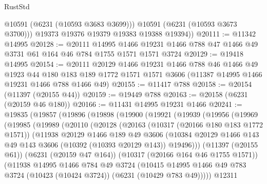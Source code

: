 \begin{lexlean}{RustStd}
\begin{coremodule}
{{            @10591
            (@6231 (@10593 @3683 @3699)))
          @10591
          (@6231 (@10593 @3673 @3700)))
        @19373
        @19376
        @19379
        @19383
        @19388
        @19394))
@20111 := @11342 @14995
@20128 := @20111
    @14995
    @1466
    @19231
    @1466
    @788
    @47
    @1466
    @49
    @3731
    @61
    @164
    @46
    @784
    @1755
    @1571
    @1571
    @3724
@20129 := @19418 @14995
@20154 := @20111
    @20129
    @1466
    @19231
    @1466
    @788
    @46
    @1466
    @49
    @1923
    @44
    @180
    @183
    @189
    @1772
    @1571
    @1571
    @3606
    (@11387 @14995 @1466 @19231 @1466 @788 @1466 @49)
@20155 := @11417 @788
@20158 := @20154 (@11397 (@20155 @44))
@20159 := @19449 @788
@20163 := @20158 (@6231 (@20159 @46 @180))
@20166 := @11431 @14995 @19231 @1466
@20241 := @19835
    (@19857
      (@19896
        (@19898
          (@19900
            (@19921
              (@19939
                (@19956
                  (@19969
                    (@19985
                      (@19989
                        (@20110
                          (@20128
                            (@20163
                              (@10317 (@20166 @180 @183 @1772 @1571))
                              (@11938
                                @20129
                                @1466
                                @189
                                @49
                                @3606
                                (@10384
                                  @20129
                                  @1466
                                  @143
                                  @49
                                  @143
                                  @3606
                                  (@10392 (@10393 @20129 @143))
                                  @19496)))
                            (@11397 (@20155 @61))
                            (@6231 (@20159 @47 @164))
                            (@10317 (@20166 @164 @46 @1755 @1571))
                            (@11938
                              @14995
                              @1466
                              @784
                              @49
                              @3724
                              (@10415
                                @14995
                                @1466
                                @49
                                @783
                                @3724
                                (@10423 (@10424 @3724))
                                (@6231 (@10429 @783 @49)))))
                          @12311
}}
\end{coremodule}
\end{lexlean}
